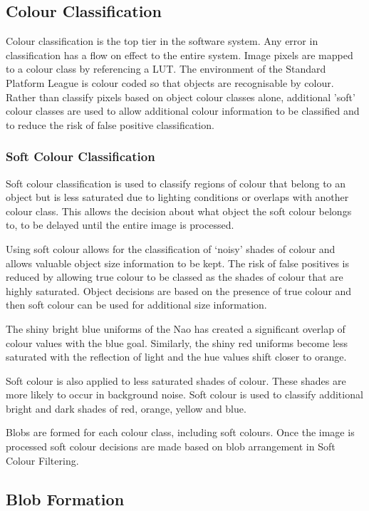 \subsection{Colour Classification}

Colour classification is the top tier in the software system. Any error in classification has a flow on effect to the entire system. Image pixels are mapped to a colour class by referencing a LUT. The environment of the Standard Platform League is colour coded so that objects are recognisable by colour. Rather than classify pixels based on object colour classes alone, additional 'soft' colour classes are used to allow additional colour information to be classified and to reduce the risk of false positive classification.

\subsubsection{Soft Colour Classification}

Soft colour classification is used to classify regions of colour that belong to an object but is less saturated due to lighting conditions or overlaps with another colour class. This allows the decision about what object the soft colour belongs to, to be delayed until the entire image is processed.

Using soft colour allows for the classification of `noisy' shades of colour and allows valuable object size information to be kept. The risk of false positives is reduced by allowing true colour to be classed as the shades of colour that are highly saturated. Object decisions are based on the presence of true colour and then soft colour can be used for additional size information.

The shiny bright blue uniforms of the Nao has created a significant overlap of colour values with the blue goal. Similarly, the shiny red uniforms become less saturated with the reflection of light and the hue values shift closer to orange.

Soft colour is also applied to less saturated shades of colour. These shades are more likely to occur in background noise. Soft colour is used to classify additional bright and dark shades of red, orange, yellow and blue. 
 
Blobs are formed for each colour class, including soft colours. Once the image is processed soft colour decisions are made based on blob arrangement in Soft Colour Filtering. 

\subsection{Blob Formation}

